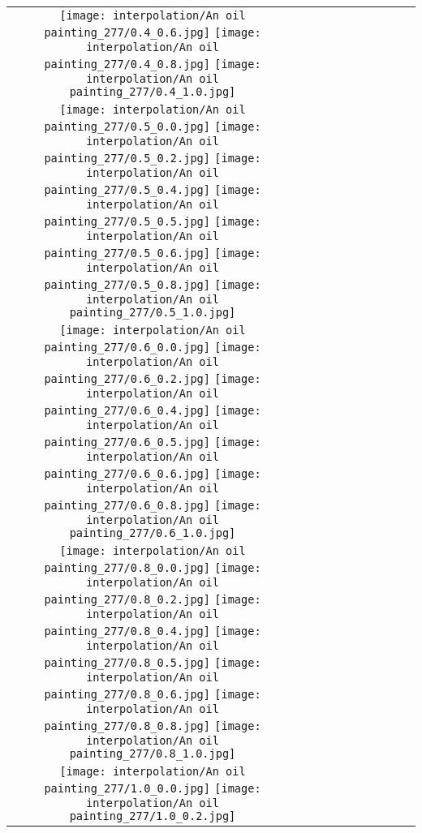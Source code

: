 \documentclass[10pt,twocolumn,letterpaper]{article}
\begin{document}
\begin{figure*}[tb!]
{\begin{tabular}{c c c c c c c c c c}
  \texttt{[image: interpolation/An oil painting\_277/0.4\_0.6.jpg]}
  \texttt{[image: interpolation/An oil painting\_277/0.4\_0.8.jpg]}
  \texttt{[image: interpolation/An oil painting\_277/0.4\_1.0.jpg]}
\tabularnewline
    \raisebox{0.1in}{\rotatebox{90}{\small \emph{$0.5$}
 }}
  \texttt{[image: interpolation/An oil painting\_277/0.5\_0.0.jpg]}
  \texttt{[image: interpolation/An oil painting\_277/0.5\_0.2.jpg]}
  \texttt{[image: interpolation/An oil painting\_277/0.5\_0.4.jpg]}
  \texttt{[image: interpolation/An oil painting\_277/0.5\_0.5.jpg]}
  \texttt{[image: interpolation/An oil painting\_277/0.5\_0.6.jpg]}
  \texttt{[image: interpolation/An oil painting\_277/0.5\_0.8.jpg]}
  \texttt{[image: interpolation/An oil painting\_277/0.5\_1.0.jpg]}
\tabularnewline
    \raisebox{0.1in}{\rotatebox{90}{\small \emph{$0.6$}
 }}
  \texttt{[image: interpolation/An oil painting\_277/0.6\_0.0.jpg]}
  \texttt{[image: interpolation/An oil painting\_277/0.6\_0.2.jpg]}
  \texttt{[image: interpolation/An oil painting\_277/0.6\_0.4.jpg]}
  \texttt{[image: interpolation/An oil painting\_277/0.6\_0.5.jpg]}
  \texttt{[image: interpolation/An oil painting\_277/0.6\_0.6.jpg]}
  \texttt{[image: interpolation/An oil painting\_277/0.6\_0.8.jpg]}
  \texttt{[image: interpolation/An oil painting\_277/0.6\_1.0.jpg]}
\tabularnewline
    \raisebox{0.1in}{\rotatebox{90}{\small \emph{$0.8$}
 }}
  \texttt{[image: interpolation/An oil painting\_277/0.8\_0.0.jpg]}
  \texttt{[image: interpolation/An oil painting\_277/0.8\_0.2.jpg]}
   \texttt{[image: interpolation/An oil painting\_277/0.8\_0.4.jpg]}
  \texttt{[image: interpolation/An oil painting\_277/0.8\_0.5.jpg]}
  \texttt{[image: interpolation/An oil painting\_277/0.8\_0.6.jpg]}
  \texttt{[image: interpolation/An oil painting\_277/0.8\_0.8.jpg]}
  \texttt{[image: interpolation/An oil painting\_277/0.8\_1.0.jpg]}
\tabularnewline
    \raisebox{0.1in}{\rotatebox{90}{\small \emph{$1.0$}
 }}
  \texttt{[image: interpolation/An oil painting\_277/1.0\_0.0.jpg]}
  \texttt{[image: interpolation/An oil painting\_277/1.0\_0.2.jpg]}

\end{tabular}}
\end{figure*}
\end{document}
